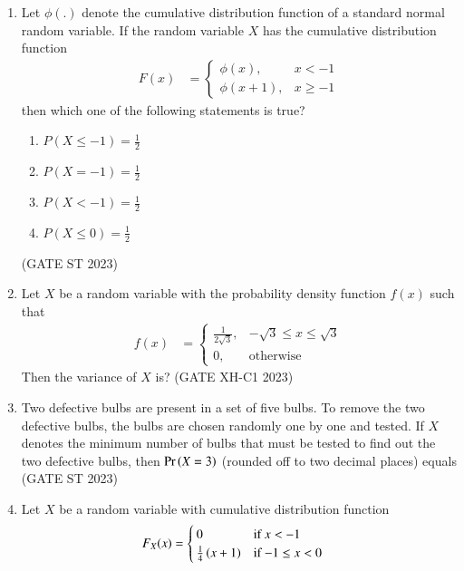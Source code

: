 \begin{enumerate}[label=\thechapter.\arabic*,ref=\thechapter.\theenumi]
\item Let $\phi(.)$ denote the cumulative distribution function of a standard normal
random variable. If the random variable $X$ has the cumulative distribution
function 
\begin{align}
	F(x)&= 
    \begin{cases}
        \phi(x), &  x < -1 \\
        \phi(x+1) , &  x \ge -1
    \end{cases} 
\end{align}
then which one of the following statements is true?
\begin{enumerate}
\item $P(X \leq -1) = \frac{1}{2}$
\item $P(X = -1) = \frac{1}{2}$
\item $P(X < -1) = \frac{1}{2}$
\item $P(X \leq 0) = \frac{1}{2}$
\end{enumerate}
\hfill(GATE ST 2023)
\\

\item Let $X$ be a random variable with the probability density function $f(x)$ such that
\begin{align}
f(x) &= 
	\begin{cases}
		\frac{1}{2\sqrt{3}}, & -\sqrt{3} \leq x \leq \sqrt{3} \\
		0, & \text{otherwise}
	\end{cases}
\end{align}
Then the variance of $X$ is?
\hfill(GATE XH-C1 2023)
\\

\item Two defective bulbs are present in a set of five bulbs. To remove the two
defective bulbs, the bulbs are chosen randomly one by one and tested. If $X$
denotes the minimum number of bulbs that must be tested to find out the two
defective bulbs, then $\Pr\left(X=3\right)$ (rounded off to two decimal places)
equals\\
\hfill(GATE ST 2023)\\

\item Let $X$ be a random variable with cumulative distribution function
\begin{align}
F_X(x) &= 
	\begin{cases}
		0 & \text{if $x < -1$}\\
		\frac{1}{4}\left(x+1\right) & \text{if $-1 \leq x < 0$}\\

\end{cases}
\end{align}
\end{enumerate}
